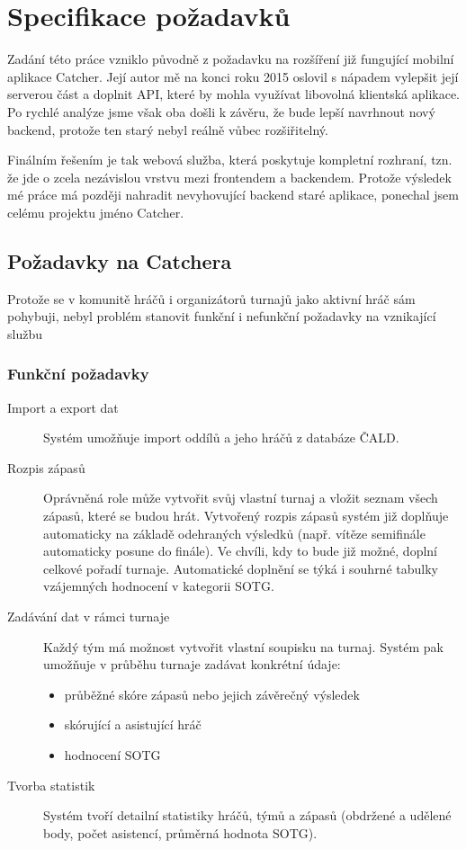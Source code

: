 \chapter{Specifikace požadavků}

Zadání této práce vzniklo původně z požadavku na rozšíření již fungující mobilní aplikace Catcher.
Její autor mě na konci roku 2015 oslovil s nápadem vylepšit její serverou část a doplnit API,
které by mohla využívat libovolná klientská aplikace. Po rychlé analýze jsme však oba došli k závěru,
že bude lepší navrhnout nový backend, protože ten starý nebyl reálně vůbec rozšiřitelný. %

Finálním řešením je tak webová služba, která poskytuje kompletní rozhraní,
tzn. že jde o zcela nezávislou vrstvu mezi frontendem a backendem.
Protože výsledek mé práce má později nahradit nevyhovující backend staré aplikace, ponechal jsem celému projektu jméno Catcher.

\section{Požadavky na Catchera}

Protože se v komunitě hráčů i organizátorů turnajů jako aktivní hráč sám pohybuji,
nebyl problém stanovit funkční i nefunkční požadavky na vznikající službu

\subsection{Funkční požadavky}

\begin{description}
  \item[Import a export dat]
    Systém umožňuje import oddílů a jeho hráčů z databáze ČALD.
  \item[Rozpis zápasů]
    Oprávněná role může vytvořit svůj vlastní turnaj a vložit seznam všech zápasů,
    které se budou hrát. Vytvořený rozpis zápasů systém již doplňuje automaticky na základě
    odehraných výsledků (např. vítěze semifinále automaticky posune do finále). Ve chvíli,
    kdy to bude již možné, doplní celkové pořadí turnaje. Automatické doplnění se týká i 
    souhrné tabulky vzájemných hodnocení v kategorii SOTG.
  \item[Zadávání dat v rámci turnaje]
    Každý tým má možnost vytvořit vlastní soupisku na turnaj. Systém pak umožňuje
    v průběhu turnaje zadávat konkrétní údaje:
    \begin{itemize}
      \item průběžné skóre zápasů nebo jejich závěrečný výsledek
      \item skórující a asistující hráč
      \item hodnocení SOTG
    \end{itemize}
  \item[Tvorba statistik]
    Systém tvoří detailní statistiky hráčů, týmů a zápasů (obdržené a udělené body,
    počet asistencí, průměrná hodnota SOTG).
\end{description}

